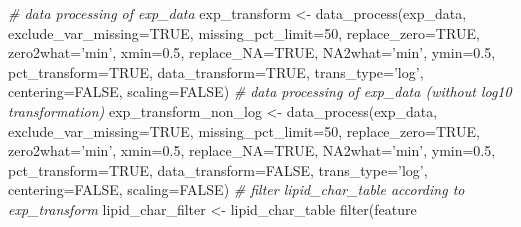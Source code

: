 \documentclass[]{article}
\newcommand{\hlnum}[1]{\textcolor[rgb]{0.816,0.125,0.439}{#1}}%
\newcommand{\hlstr}[1]{\textcolor[rgb]{0.251,0.627,0.251}{#1}}%
\newcommand{\hlcom}[1]{\textcolor[rgb]{0.502,0.502,0.502}{\textit{#1}}}%
\newcommand{\hlopt}[1]{\textcolor[rgb]{0,0,0}{#1}}%
\newcommand{\hlstd}[1]{\textcolor[rgb]{0.251,0.251,0.251}{#1}}%
\newcommand{\hlkwc}[1]{\textcolor[rgb]{0.251,0.251,0.251}{#1}}%
\newcommand{\hlkwd}[1]{\textcolor[rgb]{0.878,0.439,0.125}{#1}}%
\newenvironment{Shaded}{\begin{myshaded}}{\end{myshaded}}
\newcommand{\KeywordTok}[1]{\hlkwd{#1}}
\newcommand{\DataTypeTok}[1]{\hlkwc{#1}}
\newcommand{\DecValTok}[1]{\hlnum{#1}}
\newcommand{\FloatTok}[1]{\hlnum{#1}}
\newcommand{\StringTok}[1]{\hlstr{#1}}
\newcommand{\CommentTok}[1]{\hlcom{#1}}
\newcommand{\OtherTok}[1]{{#1}}
\newcommand{\OperatorTok}[1]{\hlopt{#1}}
\newcommand{\NormalTok}[1]{\hlstd{#1}}
\begin{document}
\begin{Shaded}
\begin{Highlighting}[]
\CommentTok{# data processing of exp_data}
\NormalTok{exp_transform <-}\StringTok{ }\KeywordTok{data_process}\NormalTok{(exp_data, }\DataTypeTok{exclude_var_missing=}\OtherTok{TRUE}\NormalTok{,}
                              \DataTypeTok{missing_pct_limit=}\DecValTok{50}\NormalTok{, }\DataTypeTok{replace_zero=}\OtherTok{TRUE}\NormalTok{,}
                              \DataTypeTok{zero2what=}\StringTok{'min'}\NormalTok{, }\DataTypeTok{xmin=}\FloatTok{0.5}\NormalTok{, }\DataTypeTok{replace_NA=}\OtherTok{TRUE}\NormalTok{,}
                              \DataTypeTok{NA2what=}\StringTok{'min'}\NormalTok{, }\DataTypeTok{ymin=}\FloatTok{0.5}\NormalTok{, }\DataTypeTok{pct_transform=}\OtherTok{TRUE}\NormalTok{,}
                              \DataTypeTok{data_transform=}\OtherTok{TRUE}\NormalTok{, }\DataTypeTok{trans_type=}\StringTok{'log'}\NormalTok{,}
                              \DataTypeTok{centering=}\OtherTok{FALSE}\NormalTok{, }\DataTypeTok{scaling=}\OtherTok{FALSE}\NormalTok{)}
\CommentTok{# data processing of exp_data (without log10 transformation)}
\NormalTok{exp_transform_non_log <-}\StringTok{ }\KeywordTok{data_process}\NormalTok{(exp_data,}
                                      \DataTypeTok{exclude_var_missing=}\OtherTok{TRUE}\NormalTok{,}
                                      \DataTypeTok{missing_pct_limit=}\DecValTok{50}\NormalTok{,}
                                      \DataTypeTok{replace_zero=}\OtherTok{TRUE}\NormalTok{, }\DataTypeTok{zero2what=}\StringTok{'min'}\NormalTok{,}
                                      \DataTypeTok{xmin=}\FloatTok{0.5}\NormalTok{, }\DataTypeTok{replace_NA=}\OtherTok{TRUE}\NormalTok{,}
                                      \DataTypeTok{NA2what=}\StringTok{'min'}\NormalTok{, }\DataTypeTok{ymin=}\FloatTok{0.5}\NormalTok{,}
                                      \DataTypeTok{pct_transform=}\OtherTok{TRUE}\NormalTok{, }\DataTypeTok{data_transform=}\OtherTok{FALSE}\NormalTok{,}
                                      \DataTypeTok{trans_type=}\StringTok{'log'}\NormalTok{,}
                                      \DataTypeTok{centering=}\OtherTok{FALSE}\NormalTok{, }\DataTypeTok{scaling=}\OtherTok{FALSE}\NormalTok{)}
\CommentTok{# filter lipid_char_table according to exp_transform}
\NormalTok{lipid_char_filter <-}\StringTok{ }\NormalTok{lipid_char_table }\OperatorTok{%
\StringTok{  }\KeywordTok{filter}\NormalTok{(feature }\OperatorTok{%
}}
\end{Highlighting}
\end{Shaded}
\end{document}
